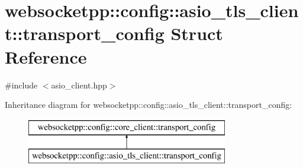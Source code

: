 \hypertarget{structwebsocketpp_1_1config_1_1asio__tls__client_1_1transport__config}{}\section{websocketpp\+:\+:config\+:\+:asio\+\_\+tls\+\_\+client\+:\+:transport\+\_\+config Struct Reference}
\label{structwebsocketpp_1_1config_1_1asio__tls__client_1_1transport__config}


{\ttfamily \#include $<$asio\+\_\+client.\+hpp$>$}

Inheritance diagram for websocketpp\+:\+:config\+:\+:asio\+\_\+tls\+\_\+client\+:\+:transport\+\_\+config\+:\begin{figure}[H]
\begin{center}
\leavevmode
\includegraphics[height=2.000000cm]{structwebsocketpp_1_1config_1_1asio__tls__client_1_1transport__config}
\end{center}
\end{figure}
